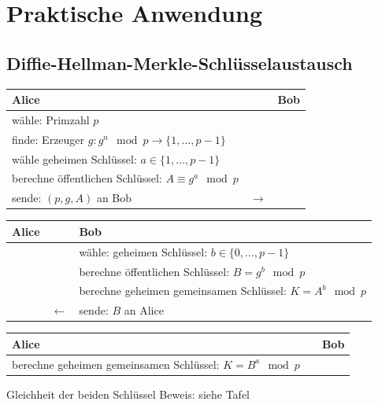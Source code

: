 \documentclass[utf8]{beamer}
\begin{document}
\section{Praktische Anwendung}
\label{sec:praktische_anwendung}

\subsection{Diffie-Hellman-Merkle-Schlüsselaustausch}
\label{sub:diffie_hellman_merkle_schlusselaustausch}

\begin{frame}{\insertsubsectionhead}
  \begin{center}
    \begin{tabularx}{\textwidth}{Xcl}
      \textbf{Alice} & & \textbf{Bob}\\\midrule
      wähle: Primzahl $p$\\
      finde: Erzeuger $g: g^n \mod p \to \{1, \ldots, p-1\}$\\
      wähle geheimen Schlüssel: $a \in \{1, \ldots, p-1\}$\\
      berechne öffentlichen Schlüssel: $A \equiv g^a \mod p$\\
      sende: $(p, g, A)$ an Bob & $\to$
    \end{tabularx}
  \end{center}

  \pause

  \begin{center}
    \begin{tabularx}{\textwidth}{lcX}
      \textbf{Alice} &  & \textbf{Bob}\\\midrule
      & & wähle: geheimen Schlüssel: $b\in \{ 0 ,\ldots , p - 1 \}$\\
      & & berechne öffentlichen Schlüssel: $B = g^b \mod p$\\
      & & berechne geheimen gemeinsamen Schlüssel: $K = A^b \mod p$\\
      & $\leftarrow$ & sende: $B$ an Alice
    \end{tabularx}
  \end{center}

  \pause

  \begin{center}
    \begin{tabularx}{\textwidth}{Xcl}
      \textbf{Alice} &  & \textbf{Bob}\\\midrule
      berechne geheimen gemeinsamen Schlüssel: $K = B^a \mod p$
    \end{tabularx}
  \end{center}
\end{frame}

\begin{frame}[t]{Gleichheit der beiden Schlüssel}
  Beweis: siehe Tafel
\end{frame}
\end{document}
